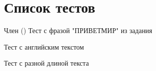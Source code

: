 \chapter{Список тестов}
\hypertarget{test}{}\label{test}

\begin{DoxyRefList}
\item[Член \doxylink{main_8cpp_ae66f6b31b5ad750f1fe042a706a4e3d4}{main} ()]\label{test__test000001}%
%
Тест с фразой "{}ПРИВЕТМИР"{} из задания 



Тест с английским текстом 



Тест с разной длиной текста 
\end{DoxyRefList}